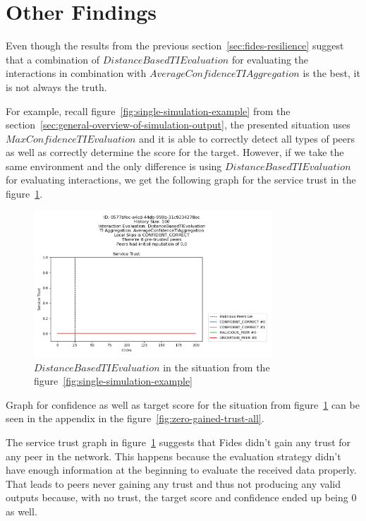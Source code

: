\newpage
\section{Other Findings}
\label{sec:other-findings}

Even though the results from the previous section~\ref{sec:fides-resilience} suggest that a combination of $DistanceBasedTIEvaluation$ for evaluating the interactions in combination with $AverageConfidenceTIAggregation$ is the best, it is not always the truth.

For example, recall figure~\ref{fig:single-simulation-example} from the section~\ref{sec:general-overview-of-simulation-output}, the presented situation uses $MaxConfidenceTIEvaluation$ and it is able to correctly detect all types of peers as well as correctly determine the score for the target.
However, if we take the same environment and the only difference is using $DistanceBasedTIEvaluation$ for evaluating interactions, we get the following graph for the service trust in the figure~\ref{fig:zero-gained-trust}.

\begin{figure}[h]
    \centering
    \includegraphics[width=0.8\textwidth]{assets/zero_gained_trust.png}
    \caption{$DistanceBasedTIEvaluation$ in the situation from the figure~\ref{fig:single-simulation-example}}
    \label{fig:zero-gained-trust}
\end{figure}

Graph for confidence as well as target score for the situation from figure~\ref{fig:zero-gained-trust} can be seen in the appendix in the figure~\ref{fig:zero-gained-trust-all}.

The service trust graph in figure~\ref{fig:zero-gained-trust} suggests that Fides didn't gain any trust for any peer in the network.
This happens because the evaluation strategy didn't have enough information at the beginning to evaluate the received data properly.
That leads to peers never gaining any trust and thus not producing any valid outputs because, with no trust, the target score and confidence ended up being $0$ as well.